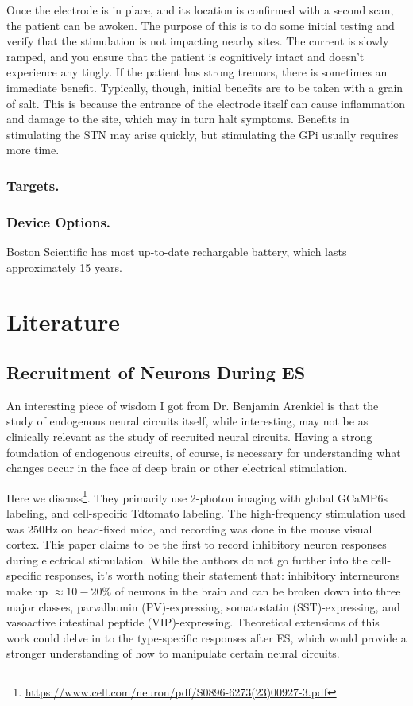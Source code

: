 Once the electrode is in place, and its location is confirmed with a second scan, the patient can be awoken. The purpose of this is to do some initial testing and verify that the stimulation is not impacting nearby sites. The current is slowly ramped, and you ensure that the patient is cognitively intact and doesn't experience any tingly. If the patient has strong tremors, there is sometimes an immediate benefit. Typically, though, initial benefits are to be taken with a grain of salt. This is because the entrance of the electrode itself can cause inflammation and damage to the site, which may in turn halt symptoms. Benefits in stimulating the STN may arise quickly, but stimulating the GPi usually requires more time. 


\subsubsection{Targets.}



\subsubsection{Device Options.}

Boston Scientific has most up-to-date rechargable battery, which lasts approximately 15 years. 
 



\section{Literature}

    \subsection{Recruitment of Neurons During ES}

    An interesting piece of wisdom I got from Dr. Benjamin Arenkiel is that the study of endogenous neural circuits itself, while interesting, may not be as clinically relevant as the study of recruited neural circuits. Having a strong foundation of endogenous circuits, of course, is necessary for understanding what changes occur in the face of deep brain or other electrical stimulation. \newline

    Here we discuss\footnote{\url{https://www.cell.com/neuron/pdf/S0896-6273(23)00927-3.pdf}}.  They primarily use 2-photon imaging with global GCaMP6s labeling, and cell-specific Tdtomato labeling. The high-frequency stimulation used was 250Hz on head-fixed mice, and recording was done in the mouse visual cortex.  This paper claims to be the first to record inhibitory neuron responses during electrical stimulation. While the authors do not go further into the cell-specific responses, it's worth noting their statement that: inhibitory interneurons make up $\approx 10-20\%$ of neurons in the brain and can be broken down into three major classes, parvalbumin (PV)-expressing, somatostatin (SST)-expressing, and vasoactive intestinal peptide (VIP)-expressing. Theoretical extensions of this work could delve in to the type-specific responses after ES, which would provide a stronger understanding of how to manipulate certain neural circuits. 
    
